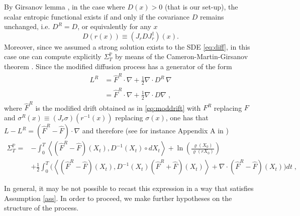 \documentclass[a4paper,11pt]{article}
\numberwithin{equation}{section}
\begin{document}
By Girsanov lemma \cite{SV79}, in the case where $D(x)>0$ (that is our set-up), the scalar entropic functional exists if and only if the covariance $D$ remains unchanged, i.e. $D^R=D$, or equivalently for any $x$
\begin{equation}\label{eq:Dinvariant}
D\left(r\left(x\right)\right)\equiv\left(J_{r} D J_{r}^\dag\right)(x).
\end{equation}
Moreover, since we assumed a strong solution exists to the SDE \eqref{eq:diff}, in this case one can compute explicitly $\varSigma_{T}^{\mathbb{P}}$ by means of the Cameron-Martin-Girsanov theorem \cite{SV79}. Since the modified diffusion process has a generator of the form 
\begin{align}
    L^{R} &= \widehat{F}^R \cdot \nabla + \frac{1}{2} \nabla \cdot D^{R}\, \nabla \nonumber\\
    &= \widehat{F}^R \cdot \nabla + \frac{1}{2} \nabla \cdot D \nabla \;,
\end{align}
where $\widehat{F}^R$ is the modified drift obtained as in \eqref{eq:moddrift} with $F^R$ replacing $F$ and $\sigma^R(x) \equiv \left(J_r \sigma \right)\left(r^{-1}(x)\right)$ replacing $\sigma(x)$, one has that $L-L^R = (\widehat{F}^R-\widehat{F}) \cdot \nabla$ and therefore (see for instance Appendix A in \cite{CT15a})
\begin{align}\label{eq:girsanov}
    \varSigma_{T}^{\mathbb{P}}=& -\int_{0}^{T} \left\langle \left(\widehat{F}^R-\widehat{F}\right)(X_{t}),D^{-1}(X_{t})\circ dX_{t}\right\rangle + \ln\left(\frac{\varrho(X_0)}{\varrho(rX_0)}\right) \nonumber \\
    & + \frac{1}{2}\int_{0}^{T} \Big( \left\langle  \left(\widehat{F}^R -\widehat{F}\right)(X_{t}),D^{-1}(X_{t})\left(\widehat{F}^R+\widehat{F}\right)(X_{t})\right\rangle + \nabla \cdot \left(\widehat{F}^R- \widehat{F}\right)(X_{t}) \Big) dt \;,
\end{align}

In general, it may be not possible to recast this expression in a way that satisfies Assumption \ref{ass}. In order to proceed, we make further hypotheses on the structure of the process.
\end{document}

